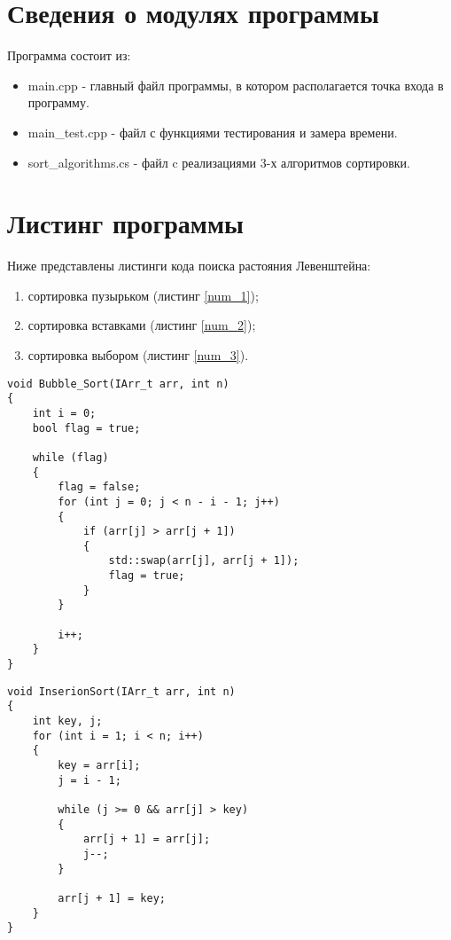 \documentclass[utf8x, 12pt]{G7-32}
\begin{document}
\section{Сведения о модулях программы}
Программа состоит из:
\begin{itemize}
	\item main.cpp - главный файл программы, в котором располагается точка входа в программу.
	\item main\_test.cpp - файл с функциями тестирования и замера времени.
	\item sort\_algorithms.cs - файл c реализациями 3-х алгоритмов сортировки.
\end{itemize}

    \section{Листинг программы}
        Ниже представлены листинги кода поиска растояния Левенштейна: \begin{enumerate}
            \item сортировка пузырьком (листинг \ref{num_1});
            \item сортировка вставками (листинг \ref{num_2});
            \item сортировка выбором (листинг \ref{num_3}).
        \end{enumerate}

\begin{lstlisting}[label=num_1,caption=Сортировка "Пузырьком", escapechar=@]
void Bubble_Sort(IArr_t arr, int n)
{
    int i = 0;
    bool flag = true;

    while (flag)
    {
        flag = false;
        for (int j = 0; j < n - i - 1; j++)
        {
            if (arr[j] > arr[j + 1])
            {
                std::swap(arr[j], arr[j + 1]);
                flag = true;
            }
        }

        i++;
    }
}
\end{lstlisting}


\begin{lstlisting}[label=num_2,caption=Сортировка вставками]
void InserionSort(IArr_t arr, int n)
{
    int key, j;
    for (int i = 1; i < n; i++)
    {
        key = arr[i];
        j = i - 1;

        while (j >= 0 && arr[j] > key)
        {
            arr[j + 1] = arr[j];
            j--;
        }

        arr[j + 1] = key;
    }
}
\end{lstlisting}
\end{document}
